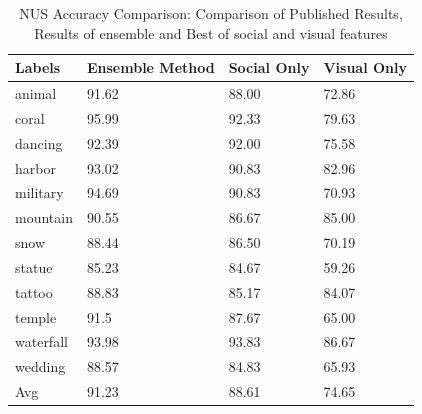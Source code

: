 \begin{table}
\centering
\caption{ NUS Accuracy Comparison: Comparison of Published Results, Results of ensemble and Best of social and visual features} %
\vspace*{0.2 cm}
\begin{tabular}{|p{2.2cm}| p{1.5cm}|p{1.2cm}|p{1.2cm}|} \hline
Labels &  Ensemble Method & Social Only & Visual Only  \\  [1ex] \hline
animal & 91.62 & 88.00 & 72.86 \\  [1ex] \hline
coral & 95.99 & 92.33 & 79.63 \\  [1ex] \hline
dancing & 92.39 & 92.00 & 75.58 \\  [1ex] \hline
harbor & 93.02 & 90.83 & 82.96 \\  [1ex] \hline
military & 94.69 & 90.83 & 70.93 \\  [1ex] \hline
mountain & 90.55 & 86.67 & 85.00 \\  [1ex] \hline
snow & 88.44 & 86.50 & 70.19 \\  [1ex] \hline
statue & 85.23 & 84.67 & 59.26 \\  [1ex] \hline
tattoo & 88.83 & 85.17 & 84.07 \\  [1ex] \hline
temple & 91.5 & 87.67 & 65.00 \\  [1ex] \hline
waterfall & 93.98 & 93.83 & 86.67 \\  [1ex] \hline
wedding & 88.57 & 84.83 & 65.93 \\  [1ex] \hline
Avg & 91.23 & 88.61 & 74.65 \\  [1ex] \hline
\end{tabular}
 \label{NUSAccuracyOverAll} %
\end{table}
